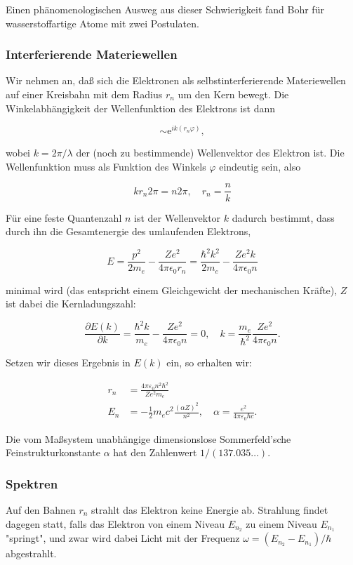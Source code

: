 \documentclass[10pt, letterpaper]{article}
\begin{document}
Einen phänomenologischen Ausweg aus dieser Schwierigkeit fand Bohr für wasserstoffartige Atome mit zwei Postulaten.

\subsubsection*{Interferierende Materiewellen}
Wir nehmen an, daß sich die Elektronen als selbstinterferierende Materiewellen auf einer Kreisbahn mit dem Radius $r_{n}$ um den Kern bewegt. Die Winkelabhängigkeit der Wellenfunktion des Elektrons ist dann

$$
\sim \mathrm{e}^{i k\left(r_{n} \varphi\right)},
$$

wobei $k=2 \pi / \lambda$ der (noch zu bestimmende) Wellenvektor des Elektron ist. Die Wellenfunktion muss als Funktion des Winkels $\varphi$ eindeutig sein, also

$$
k r_{n} 2 \pi=n 2 \pi, \quad r_{n}=\frac{n}{k}
$$

Für eine feste Quantenzahl $n$ ist der Wellenvektor $k$ dadurch bestimmt, dass durch ihn die Gesamtenergie des umlaufenden Elektrons,

$$
E=\frac{p^{2}}{2 m_{e}}-\frac{Z e^{2}}{4 \pi \epsilon_{0} r_{n}}=\frac{\hbar^{2} k^{2}}{2 m_{e}}-\frac{Z e^{2} k}{4 \pi \epsilon_{0} n}
$$

minimal wird (das entspricht einem Gleichgewicht der mechanischen Kräfte), $Z$ ist dabei die Kernladungszahl:

$$
\frac{\partial E(k)}{\partial k}=\frac{\hbar^{2} k}{m_{e}}-\frac{Z e^{2}}{4 \pi \epsilon_{0} n}=0, \quad k=\frac{m_{e}}{\hbar^{2}} \frac{Z e^{2}}{4 \pi \epsilon_{0} n} .
$$

Setzen wir dieses Ergebnis in $E(k)$ ein, so erhalten wir:

$$
\begin{aligned}
r_{n} & =\frac{4 \pi \varepsilon_{0} n^{2} \hbar^{2}}{Z e^{2} m_{e}} \\
E_{n} & =-\frac{1}{2} m_{e} c^{2} \frac{(\alpha Z)^{2}}{n^{2}}, \quad \alpha=\frac{e^{2}}{4 \pi \varepsilon_{0} \hbar c} .
\end{aligned}
$$

Die vom Maßsystem unabhängige dimensionslose Sommerfeld'sche Feinstrukturkonstante $\alpha$ hat den Zahlenwert $1 /(137.035 \ldots)$.

\subsubsection*{Spektren}
Auf den Bahnen $r_{n}$ strahlt das Elektron keine Energie ab. Strahlung findet dagegen statt, falls das Elektron von einem Niveau $E_{n_{2}}$ zu einem Niveau $E_{n_{1}}$ "springt", und zwar wird dabei Licht mit der Frequenz $\omega=\left(E_{n_{2}}-E_{n_{1}}\right) / \hbar$ abgestrahlt.
\end{document}
